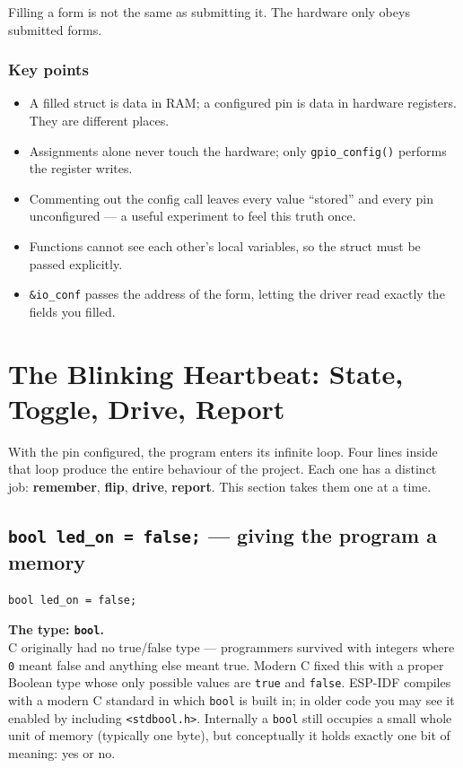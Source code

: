 \documentclass[11pt]{article}
\begin{document}
Filling a form is not the same as submitting it. The hardware only obeys submitted forms.

\subsubsection*{Key points}

\begin{itemize}
    \item A filled struct is data in RAM; a configured pin is data in hardware registers. They are different places.
    \item Assignments alone never touch the hardware; only \texttt{gpio\_config()} performs the register writes.
    \item Commenting out the config call leaves every value ``stored'' and every pin unconfigured --- a useful experiment to feel this truth once.
    \item Functions cannot see each other's local variables, so the struct must be passed explicitly.
    \item \texttt{\&io\_conf} passes the address of the form, letting the driver read exactly the fields you filled.
\end{itemize}
\section{The Blinking Heartbeat: State, Toggle, Drive, Report}

With the pin configured, the program enters its infinite loop. Four lines inside that loop produce the entire behaviour of the project. Each one has a distinct job: \textbf{remember}, \textbf{flip}, \textbf{drive}, \textbf{report}. This section takes them one at a time.

\subsection{\texttt{bool led\_on = false;} --- giving the program a memory}

\begin{verbatim}
bool led_on = false;
\end{verbatim}

\textbf{The type: \texttt{bool}.} \\
C originally had no true/false type --- programmers survived with integers where \texttt{0} meant false and anything else meant true. Modern C fixed this with a proper Boolean type whose only possible values are \texttt{true} and \texttt{false}. ESP-IDF compiles with a modern C standard in which \texttt{bool} is built in; in older code you may see it enabled by including \texttt{<stdbool.h>}. Internally a \texttt{bool} still occupies a small whole unit of memory (typically one byte), but conceptually it holds exactly one bit of meaning: yes or no.
\end{document}
